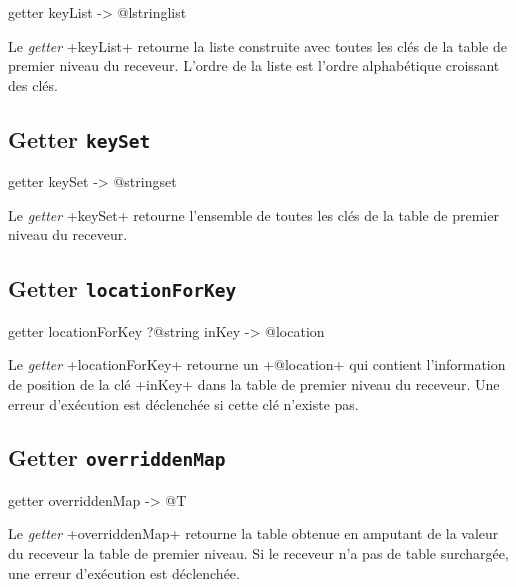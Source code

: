 \begin{galgascode}
getter keyList -> @lstringlist
\end{galgascode}


Le \emph{getter} \ggs+keyList+ retourne la liste construite avec toutes les clés de la table de premier niveau du receveur. L'ordre de la liste est l'ordre alphabétique croissant des clés.



\subsection{Getter \texttt{keySet}}

\begin{galgascode}
getter keySet -> @stringset
\end{galgascode}


Le \emph{getter} \ggs+keySet+ retourne l'ensemble de toutes les clés de la table de premier niveau du receveur.





\subsection{Getter \texttt{locationForKey}}

\begin{galgascode}
getter locationForKey ?@string inKey -> @location
\end{galgascode}


Le \emph{getter} \ggs+locationForKey+ retourne un \ggs+@location+ qui contient l'information de position de la clé \ggs+inKey+ dans la table de premier niveau du receveur. Une erreur d'exécution est déclenchée si cette clé n'existe pas.








\subsection{Getter \texttt{overriddenMap}}

\begin{galgascode}
getter overriddenMap -> @T
\end{galgascode}


Le \emph{getter} \ggs+overriddenMap+ retourne la table obtenue en amputant de la valeur du receveur la table de premier niveau. Si le receveur n'a pas de table surchargée, une erreur d'exécution est déclenchée.





